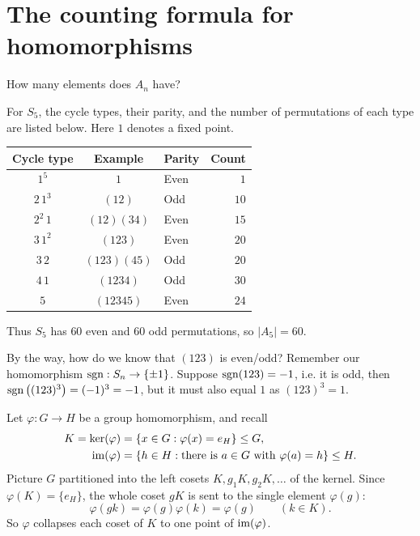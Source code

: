 \documentclass[reqno,11pt]{amsart}
\begin{document}
\makelecturetitle

\section{The counting formula for homomorphisms}


\begin{question} How many elements does $A_n$ have?

For $S_5$, the cycle types, their parity, and the number of permutations
of each type are listed below. Here $1$ denotes a fixed point.
\begin{center}
\normalfont
\begin{tabular}{ccl r}
\hline
Cycle type & Example & Parity & Count \\
\hline
$1^5$       & $1$             & Even & $1$  \\
$2\,1^3$   & $(12)$          & Odd  & $10$ \\
$2^2\,1$   & $(12)(34)$      & Even & $15$ \\
$3\,1^2$   & $(123)$         & Even & $20$ \\
$3\,2$     & $(123)(45)$     & Odd  & $20$ \\
$4\,1$     & $(1234)$        & Odd  & $30$ \\
$5$         & $(12345)$       & Even & $24$ \\
\hline
\end{tabular}
\end{center}
Thus $S_5$ has $60$ even and $60$ odd permutations, so $|A_5|=60$.

\newcommand{\rr}{\rightarrow}

By the way, how do we know that $(123)$ is even/odd? Remember our homomorphism $\sgn: S_n \rr \{ \pm 1\}$. Suppose $\operatorname{sgn}(123)=-1$, i.e. it is odd, then $\operatorname{sgn}\left( (123)^3 \right) = (-1)^3 = -1$, but it must also equal $1$ as $(123)^3=1$.

\end{question}

Let $\varphi:G\to H$ be a group homomorphism, and recall
\begin{align*}
  K=\ker(\varphi)&=\{x\in G:\varphi(x)=e_H\}\leq G,\\
  \operatorname{im}(\varphi)&=\{h\in H:\text{there is }a\in G\text{ with }\varphi(a)=h\}
  \leq H.
\end{align*}
Picture $G$ partitioned into the left cosets $K, g_1K, g_2K,\ldots$ of the
kernel. Since $\varphi(K)=\{e_H\}$, the whole coset $gK$ is sent to the
single element $\varphi(g)$:
\[
  \varphi(gk)=\varphi(g)\varphi(k)=\varphi(g)\qquad(k\in K).
\]
So $\varphi$ collapses each coset of $K$ to one point of $\operatorname{im}(\varphi)$.
\end{document}
